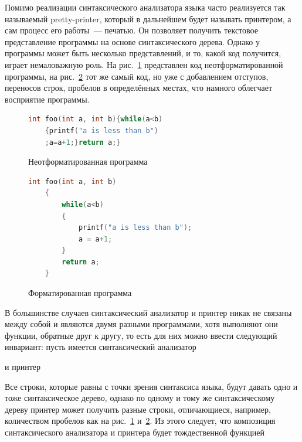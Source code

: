 Помимо реализации синтаксического анализатора языка часто реализуется так называемый pretty-printer, 
который в дальнейшем будет называть принтером, а сам процесс его работы~--- печатью. Он позволяет 
получить текстовое представление программы на основе синтаксического дерева. Однако у программы может 
быть несколько представлений, и то, какой код получится, играет немаловажную роль. На рис.~\ref{nonformatted} 
представлен код неотформатированной программы, на рис.~\ref{formatted} тот же самый код, но уже с добавлением 
отступов, переносов строк, пробелов в определённых местах, что намного облегчает восприятие программы.

\begin{figure}[h]
\centering
\begin{lstlisting}[language=C]
    int foo(int a, int b){while(a<b)
    {printf("a is less than b")
    ;a=a+1;}return a;}
\end{lstlisting}
\caption{Неотформатированная программа}
\label{nonformatted}
\end{figure}

\begin{figure}[h]
\centering
\begin{lstlisting}[language=C]
    int foo(int a, int b)
    {
        while(a<b)
        {
            printf("a is less than b");
            a = a+1;
        }
        return a;
    }    
\end{lstlisting}
\caption{Форматированная программа}
\label{formatted}
\end{figure}

В большинстве случаев синтаксический анализатор и принтер никак не связаны между собой и являются двумя 
разными программами, хотя выполняют они функции, обратные друг к другу, то есть для них можно 
ввести следующий инвариант: пусть имеется синтаксический анализатор 



\noindent и принтер



Все строки, которые равны с точки зрения синтаксиса языка, будут давать одно и тоже синтаксическое дерево, 
однако по одному и тому же синтаксическому дереву принтер может получить разные строки, отличающиеся, 
например, количеством пробелов как на рис.~\ref{nonformatted} и~\ref{formatted}.
Из этого следует, что композиция синтаксического анализатора и принтера будет тождественной функцией

